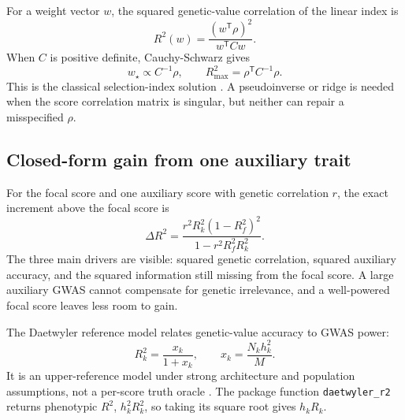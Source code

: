 \documentclass[10pt,a4paper]{article}
\newcommand{\code}[1]{\texttt{#1}}
\newcommand{\Rtwo}{\(R^2\)}
\begin{document}
For a weight vector \(w\), the squared genetic-value correlation of the linear
index is
\begin{equation}
  R^2(w)=\frac{(w^{\mathsf T}\rho)^2}{w^{\mathsf T}Cw}.
  \label{eq:index-r2}
\end{equation}
When \(C\) is positive definite, Cauchy-Schwarz gives
\begin{equation}
  w_\star \propto C^{-1}\rho,
  \qquad
  R^2_{\max}=\rho^{\mathsf T}C^{-1}\rho .
  \label{eq:index-optimum}
\end{equation}
This is the classical selection-index solution \cite{smith1936,hazel1943}.
A pseudoinverse or ridge is needed when the score correlation matrix is
singular, but neither can repair a misspecified \(\rho\).

\subsection{Closed-form gain from one auxiliary trait}

For the focal score and one auxiliary score with genetic correlation \(r\), the
exact increment above the focal score is
\begin{equation}
  \Delta R^2=
  \frac{r^2R_k^2(1-R_f^2)^2}
       {1-r^2R_f^2R_k^2}.
  \label{eq:two-score-gain}
\end{equation}
The three main drivers are visible: squared genetic correlation, squared
auxiliary accuracy, and the squared information still missing from the focal
score. A large auxiliary GWAS cannot compensate for genetic irrelevance, and
a well-powered focal score leaves less room to gain.

The Daetwyler reference model relates genetic-value accuracy to GWAS power:
\begin{equation}
  R_k^2=\frac{x_k}{1+x_k},
  \qquad
  x_k=\frac{N_k h_k^2}{M}.
  \label{eq:daetwyler}
\end{equation}
It is an upper-reference model under strong architecture and population
assumptions, not a per-score truth oracle \cite{daetwyler2008}. The package
function \code{daetwyler\_r2} returns phenotypic \Rtwo{},
\(h_k^2R_k^2\), so taking its square root gives \(h_kR_k\).
\end{document}
